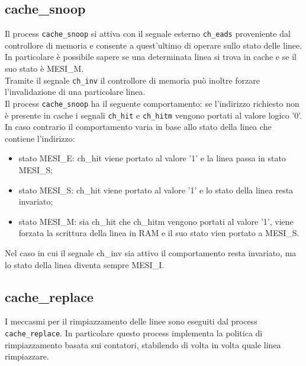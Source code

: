 \subsection{cache\_snoop}

Il process \texttt{cache\_snoop} si attiva con il segnale esterno \texttt{ch\_eads} proveniente dal controllore di memoria e consente a quest'ultimo di operare sullo stato delle linee.\\
In particolare \`e possibile sapere se una determinata linea si trova in cache e se il suo stato \`e MESI\_M.\\
Tramite il segnale \texttt{ch\_inv} il controllore di memoria pu\`o inoltre forzare l'invalidazione di una particolare linea.\\

Il process \texttt{cache\_snoop} ha il seguente comportamento: se l'indirizzo richiesto non \`e presente in cache i segnali \texttt{ch\_hit} e \texttt{ch\_hitm} vengono portati al valore logico '0'. In caso contrario il comportamento varia in base allo stato della linea che contiene l'indirizzo:
\begin{itemize}
  \item stato MESI\_E: ch\_hit viene portato al valore '1' e la linea passa in stato MESI\_S;
  \item stato MESI\_S: ch\_hit viene portato al valore '1' e lo stato della linea resta invariato;
  \item stato MESI\_M: sia ch\_hit che ch\_hitm vengono portati al valore '1', viene forzata la scrittura della linea in RAM e il suo stato vien portato a MESI\_S.
\end{itemize}

Nel caso in cui il segnale ch\_inv sia attivo il comportamento resta invariato, ma lo stato della linea diventa sempre MESI\_I. 

\subsection{cache\_replace}

I meccasmi per il rimpiazzamento delle linee sono eseguiti dal process \texttt{cache\_replace}. In particolare questo process implementa la politica di rimpiazzamento basata sui contatori, stabilendo di volta in volta quale linea rimpiazzare.\\

